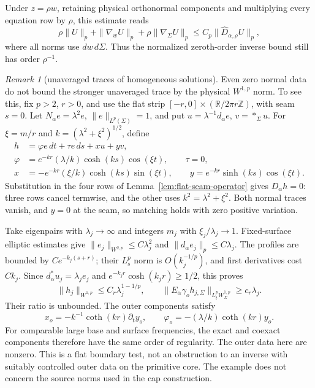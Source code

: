 \documentclass[11pt]{amsart}
\theoremstyle{definition}
\theoremstyle{remark}
\newtheorem{remark}[theorem]{Remark}
\theoremstyle{plain}
\newcommand{\ZZ}{\mathbb{Z}}
\newcommand{\RR}{\mathbb{R}}
\begin{document}
Under $z=\rho w$, retaining physical orthonormal components and
multiplying every equation row by $\rho$, this estimate reads
\begin{equation}\label{eq:flat-lp-dilation}
 \rho\|U\|_p+\|\nabla_wU\|_p+\rho\|\nabla_\Sigma U\|_p
 \leq C_p\|\widehat D_{\alpha,\rho}U\|_p,
\end{equation}
where all norms use $dw\,d\Sigma$. Thus the normalized zeroth-order
inverse bound still has order $\rho^{-1}$.

\begin{remark}[unaveraged traces of homogeneous solutions]
\label{rem:homogeneous-unaveraged-trace}
Even zero normal data do not bound the stronger unaveraged trace
by the physical $W^{1,p}$ norm. To see this, fix $p>2$, $r>0$, and use
the flat strip $[-r,0]\times(\RR/2\pi r\ZZ)$, with seam $s=0$.
Let $N_\alpha e=\lambda^2e$, $\|e\|_{L^p(\Sigma)}=1$, and
put $u=\lambda^{-1}d_\alpha e$, $v=*_{\Sigma}u$.
For $\xi=m/r$ and $k=(\lambda^2+\xi^2)^{1/2}$, define
\begin{equation}\label{eq:homogeneous-strip-mode}
 \begin{split}
 h&=\varphi e\,dt+\tau e\,ds+xu+yv,\\
 \varphi&=e^{-kr}(\lambda/k)\cosh(ks)\cos(\xi t),\qquad\tau=0,\\
 x&=-e^{-kr}(\xi/k)\cosh(ks)\sin(\xi t),\qquad
 y=e^{-kr}\sinh(ks)\cos(\xi t).
 \end{split}
\end{equation}
Substitution in the four rows of Lemma~\ref{lem:flat-seam-operator}
gives $D_\alpha h=0$: three rows cancel termwise, and the other
uses $k^2=\lambda^2+\xi^2$. Both normal traces vanish, and $y=0$
at the seam, so matching holds with zero positive variation.

Take eigenpairs with $\lambda_j\to\infty$ and integers $m_j$ with
$\xi_j/\lambda_j\to1$. Fixed-surface elliptic estimates give
$\|e_j\|_{W^{2,p}}\leq C\lambda_j^2$ and
$\|d_\alpha e_j\|_p\leq C\lambda_j$.
The profiles are bounded by $Ce^{-k_j(s+r)}$; their $L^p_s$
norm is $O(k_j^{-1/p})$, and first derivatives cost $Ck_j$.
Since $d_\alpha^*u_j=\lambda_je_j$ and
$e^{-k_jr}\cosh(k_jr)\geq1/2$, this proves
\begin{equation}\label{eq:homogeneous-strip-trace}
 \|h_j\|_{W^{1,p}}\leq C_r\lambda_j^{1-1/p},\qquad
 \|E_\alpha\gamma_oh_{j,\Sigma}\|_{L^p_tW^{1,p}_\Sigma}
                                  \geq c_r\lambda_j.
\end{equation}
Their ratio is unbounded. The outer components satisfy
\[
 x_o=-k^{-1}\coth(kr)\partial_ty_o,\qquad
 \varphi_o=-(\lambda/k)\coth(kr)y_o.
\]
For comparable large base and surface frequencies, the exact and
coexact components therefore have the same order of regularity.
The outer data here are nonzero. This is a flat boundary test,
not an obstruction to an inverse with suitably controlled outer data
on the primitive core. The example does not concern the source norms used in the cap construction.
\end{remark}
\end{document}
